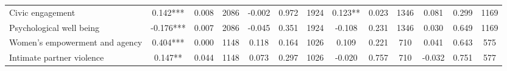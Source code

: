 \begin{tabular}{l*{12}{c}}
 Civic engagement &        0.142*** &        0.008 & 2086    &       -0.002 &        0.972 & 1924    &        0.123** &        0.023 & 1346 &        0.081 &        0.299 & 1169 \\ 

 Psychological well being &       -0.176*** &        0.007 & 2086    &       -0.045 &        0.351 & 1924    &       -0.108 &        0.231 & 1346 &        0.030 &        0.649 & 1169 \\ 

 Women's empowerment and agency &        0.404*** &        0.000 & 1148    &        0.118 &        0.164 & 1026    &        0.109 &        0.221 & 710 &        0.041 &        0.643 & 575 \\ 

 Intimate partner violence &        0.147** &        0.044 & 1148    &        0.073 &        0.297 & 1026    &       -0.020 &        0.757 & 710 &       -0.032 &        0.751 & 577 \\ 

\hline \end{tabular}
